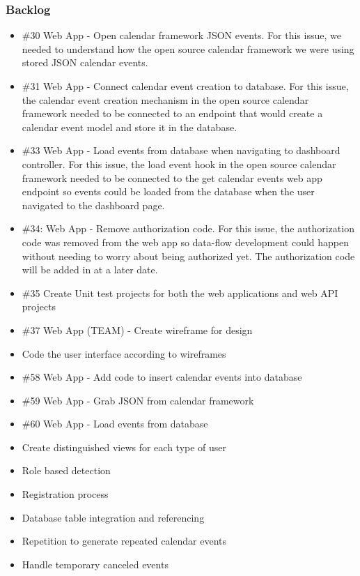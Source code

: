 \subsubsection{Backlog}
\begin{itemize}
\item \#30 Web App  - Open calendar framework JSON events. For this issue, we needed to understand how the open source calendar framework we were using stored JSON calendar events.
\item \#31 Web App - Connect calendar event creation to database. For this issue, the calendar event creation mechanism in the open source calendar framework needed to be connected to an endpoint that would create a calendar event model and store it in the database.
\item \#33 Web App - Load events from database when navigating to dashboard controller. For this issue, the load event hook in the open source calendar framework needed to be connected to the get calendar events web app endpoint so events could be loaded from the database when the user navigated to the dashboard page.
\item \#34: Web App - Remove authorization code. For this issue, the authorization code was removed from the web app so data-flow development could happen without needing to worry about being authorized yet. The authorization code will be added in at a later date.
\item \#35 Create Unit test projects for both the web applications and web API projects
\item \#37 Web App (TEAM) - Create wireframe for design
\item Code the user interface according to wireframes
\item \#58 Web App - Add code to insert calendar events into database
\item \#59 Web App - Grab JSON from calendar framework
\item \#60 Web App - Load events from database
\item Create distinguished views for each type of user
\item Role based detection
\item Registration process
\item Database table integration and referencing
\item Repetition to generate repeated calendar events
\item Handle temporary canceled events
\end{itemize}

